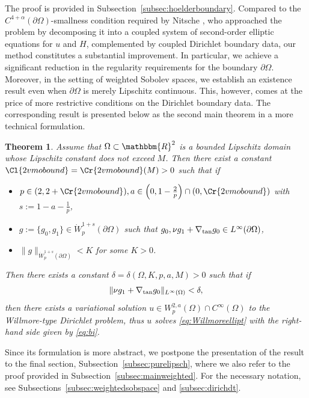 \documentclass[12pt,a4paper,twoside]{article}
\newcommand{\R}{\mathbbm {R}}
\newtheorem{thm}{Theorem}
\begin{document}
The proof is provided in Subsection~\ref{subsec:hoelderboundary}.
 Compared to the \( C^{4+\alpha}(\partial{\Omega}) \)-smallness condition required by Nitsche \cite{nitsche1993boundary}, who approached the problem by decomposing it into a coupled system of second-order elliptic equations for $u$ and $H$, complemented by coupled Dirichlet boundary data, our method constitutes a substantial improvement.  In particular, we achieve a significant reduction in the regularity requirements for the boundary \( \partial\Omega \). Moreover, in the setting of weighted Sobolev spaces, we establish an existence result even when $\partial\Omega$ is merely Lipschitz continuous. This, however, comes at the price of more restrictive conditions on the Dirichlet boundary data. The corresponding result is presented below as the second main theorem in a more technical formulation.
\begin{thm}
 \label{thm:lipschitz}
Assume that $\Omega\subset \R^2$ is a bounded Lipschitz domain whose Lipschitz constant
does not exceed $M$. Then there exist a constant $\Cl{2vmobound}=\Cr{2vmobound}(M)>0$ such that if
\begin{itemize}
    \item $p\in(2,2+\Cr{2vmobound}), a\in \Big(0,1-\frac{2}{p}\Big)\cap(0,\Cr{2vmobound})$ with $s:=1-a-\frac{1}{p}$,
    \item $g:=\{g_0,g_1\}\in \dot W^{1+s}_p(\partial\Omega)$ such that $g_0, \nu g_1+\nabla_{\rm tan} g_0\in L^{\infty}(\partial\Omega)$,
    \item $\|g\|_{\dot W^{1+s}_p(\partial\Omega)} <K$ for some $K>0$.
\end{itemize}

Then there exists a constant $\delta=\delta(\Omega,K,p,a,M)>0$ such that if 
\begin{align*}
    \|\nu g_1+\nabla_{\rm tan} g_0\|_{L^\infty(\Omega)}<\delta,
\end{align*}
then there exists a variational solution $u\in {W^{2,a}_p(\Omega)}\cap C^\infty(\Omega)$ to the Willmore-type Dirichlet problem, thus $u$ solves \eqref{eq:Willmoreellipt} with the right-hand side given by \eqref{eq:bi}.
\end{thm}
 Since its formulation is more abstract, we postpone the presentation of the result to the final section, Subsection~\ref{subsec:purelipsch}, where we also refer to the proof provided in Subsection~\ref{subsec:mainweighted}. For the necessary notation, see Subsections~\ref{subsec:weightedsobspace} and \ref{subsec:dirichdt}.
\end{document}
